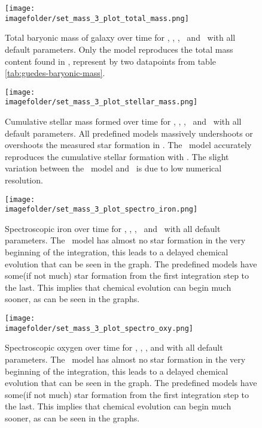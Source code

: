 \begin{figure}[h]
  \centering
  \texttt{[image: \\imagefolder/set\_mass\_3\_plot\_total\_mass.png]}
  \caption{\label{fig:fit-v1-3-total}
    Total baryonic mass of galaxy over time for \eris, \fiduccialomega, \mwomega, \mwcomega\ and \omegamodel\ with all default parameters.
    Only the \fiduccialomega model reproduces the total mass content found in \eris, represent by two datapoints from table \ref{tab:guedes-baryonic-mass}.
  }
\end{figure}
\begin{figure}[h]
  \centering
  \texttt{[image: \\imagefolder/set\_mass\_3\_plot\_stellar\_mass.png]}
  \caption{\label{fig:fit-v1-3-stellar}
    Cumulative stellar mass formed over time for \eris, \mwomega, \mwcomega, \fiduccialomega\ and \omegamodel\ with all default parameters.
    All predefined models massively undershoots or overshoots the measured star formation in \eris.
    The \fiduccialomega\ model accurately reproduces the cumulative stellar formation with \eris. The slight variation between the \fiduccialomega\ model and \eris\ is due to low numerical resolution.
  }
\end{figure}
\begin{figure}[h]
  \centering
  \texttt{[image: \\imagefolder/set\_mass\_3\_plot\_spectro\_iron.png]}
  \caption{\label{fig:fit-v1-3-iron}
    Spectroscopic iron over time for \eris, \mwomega, \mwcomega, \fiduccialomega\ and \omegamodel\ with all default parameters.
    The \fiduccialomega\ model has almost no star formation in the very beginning of the integration, this leads to a delayed chemical evolution that can be seen in the graph. The predefined models have some(if not much) star formation from the first integration step to the last. This implies that chemical evolution can begin much sooner, as can be seen in the graphs.
  }
\end{figure}
\begin{figure}[h]
  \centering
  \texttt{[image: \\imagefolder/set\_mass\_3\_plot\_spectro\_oxy.png]}
  \caption{\label{fig:fit-v1-3-oxy}
    Spectroscopic oxygen over time for \eris, \mwomega, \mwcomega, \fiduccialomega and \omegamodel with all default parameters.
    The \fiduccialomega\ model has almost no star formation in the very beginning of the integration, this leads to a delayed chemical evolution that can be seen in the graph. The predefined models have some(if not much) star formation from the first integration step to the last. This implies that chemical evolution can begin much sooner, as can be seen in the graphs.
  }
\end{figure}

